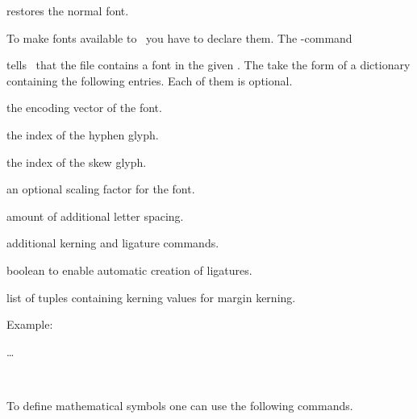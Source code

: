 \begin{code}
\cs{\normalfont}
\end{code}
restores the normal font.

To make fonts available to \ant\ you have to declare them. The \AL-command
\begin{code}
        
\end{code}
tells \ant\ that the file  contains a font in the given . The 
take the form of a dictionary containing the following entries. Each of them is optional.
\begin{longdescription}
\item{\quad}
  the encoding vector of the font.
\item{\quad}
  the index of the hyphen glyph.
\item{\quad}
  the index of the skew glyph.
\item{\quad}
  an optional scaling factor for the font.
\item{\quad}
  amount of additional letter spacing.
\item{\quad}
  additional kerning and ligature commands.
\item{\quad}
  boolean to enable automatic creation of ligatures.
\item{\quad}
  list of tuples containing kerning values for margin kerning.
\end{longdescription}
Example\?:
\begin{code}
    \cs{:=}  \ldots\ 


  \quad
          
     \blue\texttt\textlbrace\  \cs{:=}  \texttt\textrbrace\cs{;}

\end{code}

To define mathematical symbols one can use the following commands.
\begin{code}
      

     
      

     

      
      
\end{code}



